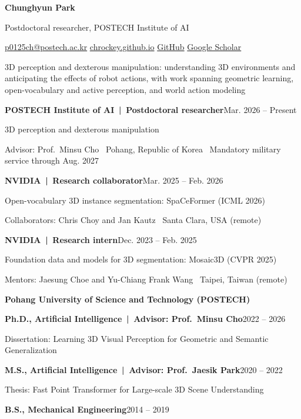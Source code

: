 \documentclass[letterpaper,10pt]{article}
\newcommand{\cvsection}[1]{\par\addvspace{12pt}{\fontsize{11}{13}\selectfont\bfseries #1}\par\vspace{4pt}{\color{Rule}\hrule}\vspace{6pt}}
\newcommand{\entry}[3]{\textbf{#1}\hfill{\small\color{Muted}#2}\par #3\par\vspace{5pt}}
\begin{document}
{\fontsize{29}{33}\selectfont\bfseries Chunghyun Park}\par\vspace{5pt}
{\color{Muted}Postdoctoral researcher, POSTECH Institute of AI}\par\vspace{5pt}
{\small\href{mailto:p0125ch@postech.ac.kr}{p0125ch@postech.ac.kr}\quad\textperiodcentered\quad
\href{https://chrockey.github.io}{chrockey.github.io}\quad\textperiodcentered\quad
\href{https://github.com/chrockey}{GitHub}\quad\textperiodcentered\quad
\href{https://scholar.google.com/citations?user=5ABvjQcAAAAJ}{Google Scholar}}

\cvsection{Research}
3D perception and dexterous manipulation: understanding 3D environments and anticipating the effects of robot actions, with work spanning geometric learning, open-vocabulary and active perception, and world action modeling

\cvsection{Experience}
\entry{POSTECH Institute of AI \textnormal{\,|\, Postdoctoral researcher}}{Mar. 2026 -- Present}{
3D perception and dexterous manipulation\par
{\small\color{Muted}Advisor: Prof.\ Minsu Cho \textperiodcentered\ Pohang, Republic of Korea \textperiodcentered\ Mandatory military service through Aug. 2027}}
\entry{NVIDIA \textnormal{\,|\, Research collaborator}}{Mar. 2025 -- Feb. 2026}{
Open-vocabulary 3D instance segmentation: SpaCeFormer (ICML 2026)\par
{\small\color{Muted}Collaborators: Chris Choy and Jan Kautz \textperiodcentered\ Santa Clara, USA (remote)}}
\entry{NVIDIA \textnormal{\,|\, Research intern}}{Dec. 2023 -- Feb. 2025}{
Foundation data and models for 3D segmentation: Mosaic3D (CVPR 2025)\par
{\small\color{Muted}Mentors: Jaesung Choe and Yu-Chiang Frank Wang \textperiodcentered\ Taipei, Taiwan (remote)}}

\cvsection{Education}
\textbf{Pohang University of Science and Technology (POSTECH)}\par\vspace{4pt}
\entry{Ph.D., Artificial Intelligence \textnormal{\small\color{Muted}\,|\, Advisor: Prof.\ Minsu Cho}}{2022 -- 2026}{
{\small Dissertation: Learning 3D Visual Perception for Geometric and Semantic Generalization}}
\entry{M.S., Artificial Intelligence \textnormal{\small\color{Muted}\,|\, Advisor: Prof.\ Jaesik Park}}{2020 -- 2022}{
{\small Thesis: Fast Point Transformer for Large-scale 3D Scene Understanding}}
\textbf{B.S., Mechanical Engineering}\hfill{\small\color{Muted}2014 -- 2019}\par
\end{document}
